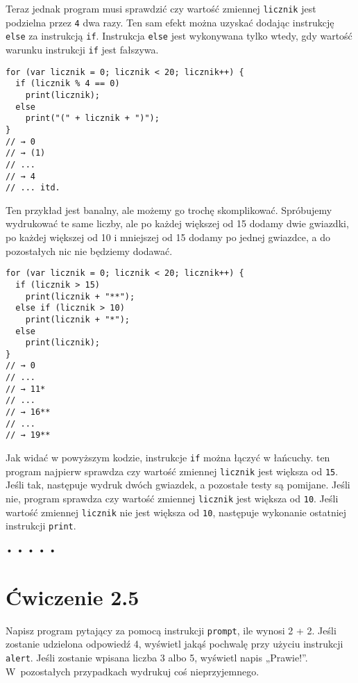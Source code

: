 Teraz jednak program musi sprawdzić czy wartość zmiennej \texttt{licznik} jest podzielna przez \texttt{4} dwa razy. Ten sam efekt można uzyskać dodając instrukcję \texttt{else} za instrukcją \texttt{if}. Instrukcja \texttt{else} jest wykonywana tylko wtedy, gdy wartość warunku instrukcji \texttt{if} jest fałszywa.

\begin{verbatim} 
for (var licznik = 0; licznik < 20; licznik++) {
  if (licznik % 4 == 0)
    print(licznik);
  else
    print("(" + licznik + ")");
}
// → 0
// → (1)
// ...
// → 4
// ... itd.
\end{verbatim}
    
Ten przykład jest banalny, ale możemy go trochę skomplikować. Spróbujemy wydrukować te same liczby, ale po każdej większej od 15 dodamy dwie gwiazdki, po każdej większej od 10 i mniejszej od 15 dodamy po jednej gwiazdce, a do pozostałych nic nie będziemy dodawać.

\begin{verbatim} 
for (var licznik = 0; licznik < 20; licznik++) {
  if (licznik > 15)
    print(licznik + "**");
  else if (licznik > 10)
    print(licznik + "*");
  else
    print(licznik);
}
// → 0
// ...
// → 11*
// ...
// → 16**
// ...
// → 19**
\end{verbatim}
    
Jak widać w powyższym kodzie, instrukcje \texttt{if} można łączyć w łańcuchy. ten program najpierw sprawdza czy wartość zmiennej \texttt{licznik} jest większa od \texttt{15}. Jeśli tak, następuje wydruk dwóch gwiazdek, a pozostałe testy są pomijane. Jeśli nie, program sprawdza czy wartość zmiennej \texttt{licznik} jest większa od \texttt{10}. Jeśli wartość zmiennej \texttt{licznik} nie jest większa od \texttt{10}, następuje wykonanie ostatniej instrukcji \texttt{print}.

  
\begin{center}
• • • • •
\end{center}
  
\section*{Ćwiczenie 2.5}
\label{sec:2.5}
    
      
Napisz program pytający za pomocą instrukcji \texttt{prompt}, ile wynosi 2 + 2. Jeśli zostanie udzielona odpowiedź 4, wyświetl jakąś pochwalę przy użyciu instrukcji \texttt{alert}. Jeśli zostanie wpisana liczba 3 albo 5, wyświetl napis „Prawie!”. W~pozostałych przypadkach wydrukuj coś nieprzyjemnego.

